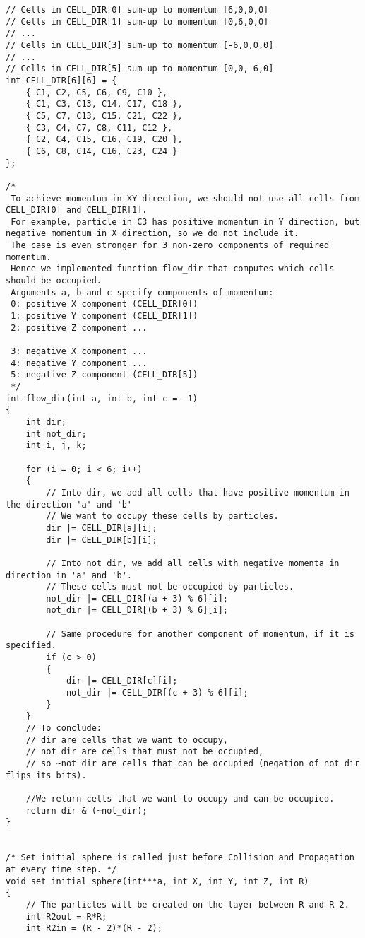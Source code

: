 \begin{lstlisting}
// Cells in CELL_DIR[0] sum-up to momentum [6,0,0,0]
// Cells in CELL_DIR[1] sum-up to momentum [0,6,0,0]
// ...
// Cells in CELL_DIR[3] sum-up to momentum [-6,0,0,0]
// ...
// Cells in CELL_DIR[5] sum-up to momentum [0,0,-6,0]
int CELL_DIR[6][6] = {
	{ C1, C2, C5, C6, C9, C10 },
	{ C1, C3, C13, C14, C17, C18 },
	{ C5, C7, C13, C15, C21, C22 },
	{ C3, C4, C7, C8, C11, C12 },
	{ C2, C4, C15, C16, C19, C20 },
	{ C6, C8, C14, C16, C23, C24 }
};

/* 
 To achieve momentum in XY direction, we should not use all cells from CELL_DIR[0] and CELL_DIR[1].
 For example, particle in C3 has positive momentum in Y direction, but negative momentum in X direction, so we do not include it.
 The case is even stronger for 3 non-zero components of required momentum.
 Hence we implemented function flow_dir that computes which cells should be occupied.
 Arguments a, b and c specify components of momentum: 
 0: positive X component (CELL_DIR[0])
 1: positive Y component (CELL_DIR[1])
 2: positive Z component ...
 
 3: negative X component ...
 4: negative Y component ...
 5: negative Z component (CELL_DIR[5])
 */
int flow_dir(int a, int b, int c = -1)
{
	int dir;
	int not_dir;
	int i, j, k;

	for (i = 0; i < 6; i++)
	{
		// Into dir, we add all cells that have positive momentum in the direction 'a' and 'b'
		// We want to occupy these cells by particles.
		dir |= CELL_DIR[a][i];
		dir |= CELL_DIR[b][i];

		// Into not_dir, we add all cells with negative momenta in direction in 'a' and 'b'.
		// These cells must not be occupied by particles.
		not_dir |= CELL_DIR[(a + 3) % 6][i];
		not_dir |= CELL_DIR[(b + 3) % 6][i];

		// Same procedure for another component of momentum, if it is specified.
		if (c > 0)
		{
			dir |= CELL_DIR[c][i];
			not_dir |= CELL_DIR[(c + 3) % 6][i];
		}
	}
	// To conclude:
	// dir are cells that we want to occupy,
	// not_dir are cells that must not be occupied,
	// so ~not_dir are cells that can be occupied (negation of not_dir flips its bits).
	
	//We return cells that we want to occupy and can be occupied.
	return dir & (~not_dir);
}


/* Set_initial_sphere is called just before Collision and Propagation at every time step. */
void set_initial_sphere(int***a, int X, int Y, int Z, int R)
{
	// The particles will be created on the layer between R and R-2.
	int R2out = R*R;
	int R2in = (R - 2)*(R - 2);
	

\end{lstlisting}
